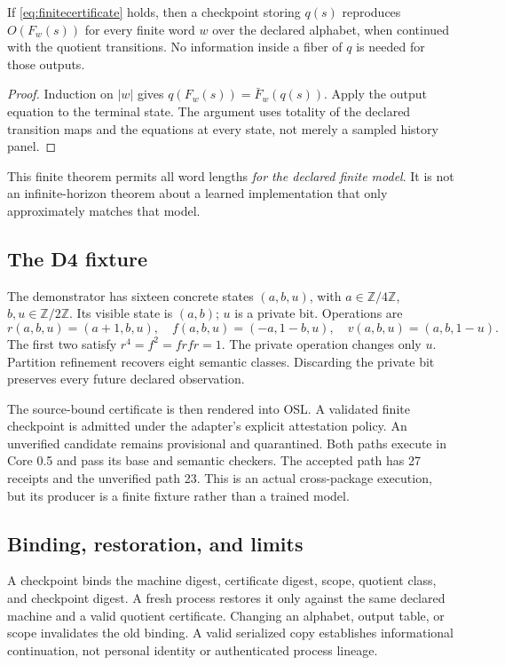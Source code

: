 \documentclass[11pt]{article}
\begin{document}
\begin{theorem}\label{thm:checkpoint}
If \eqref{eq:finitecertificate} holds, then a checkpoint storing \(q(s)\) reproduces \(O(F_w(s))\) for every finite word \(w\) over the declared alphabet, when continued with the quotient transitions. No information inside a fiber of \(q\) is needed for those outputs.
\end{theorem}
\begin{proof}
Induction on \(|w|\) gives \(q(F_w(s))=\bar F_w(q(s))\). Apply the output equation to the terminal state. The argument uses totality of the declared transition maps and the equations at every state, not merely a sampled history panel.
\end{proof}
This finite theorem permits all word lengths \emph{for the declared finite model}. It is not an infinite-horizon theorem about a learned implementation that only approximately matches that model.

\subsection{The D4 fixture}
The demonstrator has sixteen concrete states \((a,b,u)\), with \(a\in\mathbb Z/4\mathbb Z\), \(b,u\in\mathbb Z/2\mathbb Z\). Its visible state is \((a,b)\); \(u\) is a private bit. Operations are
\[
 r(a,b,u)=(a+1,b,u),\quad f(a,b,u)=(-a,1-b,u),\quad
 v(a,b,u)=(a,b,1-u).
\]
The first two satisfy \(r^4=f^2=frfr=1\). The private operation changes only \(u\). Partition refinement recovers eight semantic classes. Discarding the private bit preserves every future declared observation.

The source-bound certificate is then rendered into OSL. A validated finite checkpoint is admitted under the adapter's explicit attestation policy. An unverified candidate remains provisional and quarantined. Both paths execute in Core 0.5 and pass its base and semantic checkers. The accepted path has 27 receipts and the unverified path 23. This is an actual cross-package execution, but its producer is a finite fixture rather than a trained model.

\subsection{Binding, restoration, and limits}
A checkpoint binds the machine digest, certificate digest, scope, quotient class, and checkpoint digest. A fresh process restores it only against the same declared machine and a valid quotient certificate. Changing an alphabet, output table, or scope invalidates the old binding. A valid serialized copy establishes informational continuation, not personal identity or authenticated process lineage.
\end{document}
